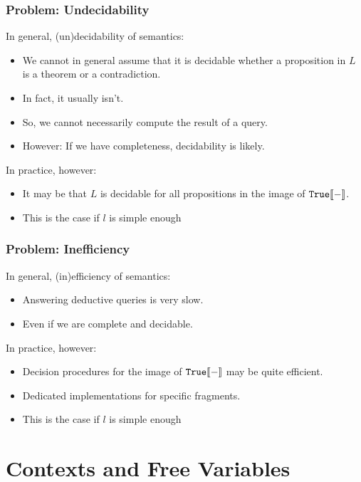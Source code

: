 \documentclass{beamer}
\begin{document}
\begin{frame}\frametitle{Problem: Undecidability}
In general, (un)decidability of semantics:
\begin{itemize}
\item We cannot in general assume that it is decidable whether a proposition in $L$ is a theorem or a contradiction.
\item In fact, it usually isn't.
\item So, we cannot necessarily compute the result of a query.
\item However: If we have completeness, decidability is likely.
\end{itemize}

In practice, however:
\begin{itemize}
\item It may be that $L$ is decidable for all propositions in the image of $\mathtt{True}\llbracket -\rrbracket$.
\item This is the case if $l$ is simple enough 
\end{itemize}
\end{frame}

\begin{frame}\frametitle{Problem: Inefficiency}
In general, (in)efficiency of semantics:
\begin{itemize}
\item Answering deductive queries is very slow.
\item Even if we are complete and decidable.
\end{itemize}

In practice, however:
\begin{itemize}
\item Decision procedures for the image of $\mathtt{True}\llbracket -\rrbracket$ may be quite efficient.
\item Dedicated implementations for specific fragments.
\item This is the case if $l$ is simple enough 
\end{itemize}
\end{frame}

\section{Contexts and Free Variables}
\end{document}
